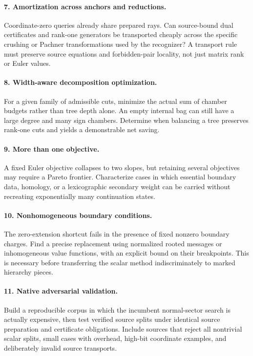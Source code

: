 \paragraph{7. Amortization across anchors and reductions.}
Coordinate-zero queries already share prepared rays. Can source-bound dual
certificates and rank-one generators be transported cheaply across the specific
crushing or Pachner transformations used by the recognizer? A transport rule
must preserve source equations and forbidden-pair locality, not just matrix
rank or Euler values.

\paragraph{8. Width-aware decomposition optimization.}
For a given family of admissible cuts, minimize the actual sum of chamber
budgets rather than tree depth alone. An empty internal bag can still have a
large degree and many sign chambers. Determine when balancing a tree preserves
rank-one cuts and yields a demonstrable net saving.

\paragraph{9. More than one objective.}
A fixed Euler objective collapses to two slopes, but retaining several
objectives may require a Pareto frontier. Characterize cases in which essential
boundary data, homology, or a lexicographic secondary weight can be carried
without recreating exponentially many continuation states.

\paragraph{10. Nonhomogeneous boundary conditions.}
The zero-extension shortcut fails in the presence of fixed nonzero boundary
charges. Find a precise replacement using normalized rooted messages or
inhomogeneous value functions, with an explicit bound on their breakpoints.
This is necessary before transferring the scalar method indiscriminately to
marked hierarchy pieces.

\paragraph{11. Native adversarial validation.}
Build a reproducible corpus in which the incumbent normal-sector search is
actually expensive, then test verified source splits under identical source
preparation and certificate obligations. Include sources that reject all
nontrivial scalar splits, small cases with overhead, high-bit coordinate
examples, and deliberately invalid source transports.

